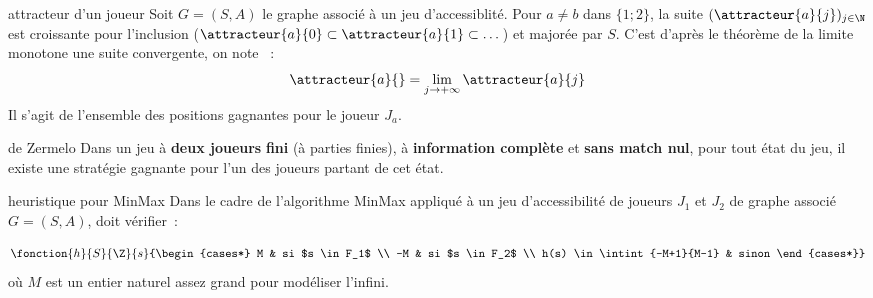 \begin{adjustwidth}{-3cm}{-3cm}
\begin{definition}{4.10}{attracteur d'un joueur}
    Soit $G = (S,A)$ le graphe associé à un jeu d'accessiblité. Pour $a \neq b$ dans $\{1;2\}$, la suite $(\attracteur{a}{j})_{j \in \N}$ est croissante pour l'inclusion ($\attracteur{a}{0} \subset \attracteur{a}{1} \subset \dots$) et majorée par $S$. C'est d'après le théorème de la limite monotone une suite convergente, on note ~:
    $$\attracteur{a}{} = \lim_{j \to + \infty} \attracteur{a}{j}$$
    Il s'agit de l'ensemble des positions gagnantes pour le joueur $J_a$.
\end{definition}

\begin{theoreme}{4.11}{de Zermelo}
    Dans un jeu à \textbf{deux joueurs} \textbf{fini} (à parties finies), à \textbf{information complète} et \textbf{sans match nul}, pour tout état du jeu, il existe une stratégie gagnante pour l'un des joueurs partant de cet état. 
\end{theoreme}

\begin{definition}{4.12}{heuristique pour MinMax}
    Dans le cadre de l'algorithme MinMax appliqué à un jeu d'accessibilité de joueurs $J_1$ et $J_2$ de graphe associé $G = (S,A)$,  doit vérifier~:

    $$\fonction{h}{S}{\Z}{s}{\begin{cases*}
    M & si $s \in F_1$ \\
    -M & si $s \in F_2$ \\
    h(s) \in \intint{-M+1}{M-1} & sinon
    \end{cases*}}$$
    où $M$ est un entier naturel assez grand pour modéliser l'infini.
\end{definition}


\end{adjustwidth}
